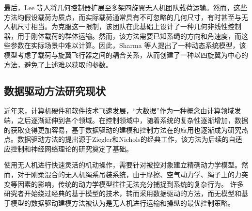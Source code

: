 \documentclass[lang=chs, degree=master, blindreview=true, winfonts=true]{yanputhesis}
\begin{document}
最后，Lee 等人\cite{lee2013geometric}将几何控制器扩展至多架四旋翼无人机团队载荷运输。然而，这些方法均假设载荷为质点，而实际载荷通常具有不可忽略的几何尺寸，有时甚至与无人机尺寸相当。为克服这一限制，该团队在此基础上设计了一种几何非线性控制器，用于刚体载荷的群体运输\cite{lee2017geometric}。然而，该方法需要已知系绳的方向和角速度，而这些参数在实际场景中难以计算。因此，Sharma 等人\cite{sharma2023geometric}提出了一种动态系统模型，该模型考虑了载荷与旋翼飞行器之间的耦合关系，从而创建了一种以四旋翼为中心的方法，避免了上述难以获取的参数。





\subsection{数据驱动方法研究现状}
近年来，计算机硬件和软件技术飞速发展，“大数据”作为一种概念由计算领域发端，之后逐渐延伸到各个领域。在控制领域中，随着系统的复杂性逐渐增加，数据的获取变得更加容易，基于数据驱动的建模和控制方法在的应用也逐渐成为研究热点。数据驱动方法的提出源于Ziegler和Nichols的经典工作\cite{ziegler1942optimum}，该方法为后续的自适应控制\cite{wittenmark1989adaptive}和神经网络理论\cite{werbos1989neural}的研究奠定了基础。

使用无人机进行快速灵活的机动操作，需要针对被控对象建立精确动力学模型。然而，对于刚柔混合的无人机绳系吊装系统，由于摩擦、空气动力学、绳子上的力突变等因素的影响，传统的动力学模型往往无法充分捕捉到系统的复杂行为。
许多研究者开始绕过经典的基于模型的技术，转而采用数据驱动的方法\cite{hou2013model}，而无模型和基于模型的数据驱动建模方法被认为是无人机进行运输和操纵的最优控制策略。
\end{document}
